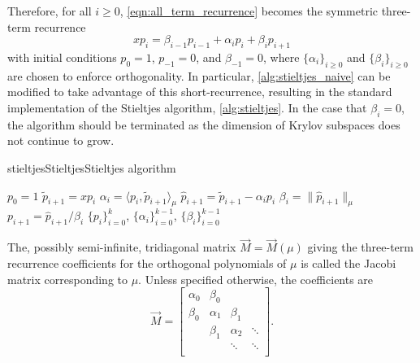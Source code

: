 Therefore, for all \( i\geq0 \), \cref{eqn:all_term_recurrence} becomes the symmetric three-term recurrence
\begin{equation}
    \label{eqn:poly_three_term}
    x p_i =  \beta_{i-1} p_{i-1} + \alpha_i p_i + \beta_{i} p_{i+1}
\end{equation}
with initial conditions \( p_0 = 1 \), \( p_{-1} = 0 \), and \( \beta_{-1} = 0 \), where \( \{ \alpha_i \}_{i\geq0} \) and \( \{ \beta_i \}_{i\geq 0} \) are chosen to enforce orthogonality.
In particular, \cref{alg:stieltjes_naive} can be modified to take advantage of this short-recurrence, resulting in the standard implementation of the Stieltjes algorithm, \cref{alg:stieltjes}.
In the case that \( \beta_i = 0 \), the algorithm should be terminated as the dimension of Krylov subspaces does not continue to grow.

\begin{labelalgorithm}[htb]{stieltjes}{Stieltjes}{Stieltjes algorithm}
\begin{algorithmic}[1]
    \State \( p_0 = 1 \)
        \State \( \tilde{p}_{i+1} = x p_i \)
        \State \( \alpha_i = \langle p_i, \tilde{p}_{i+1} \rangle_\mu \)
        \State \( \hat{p}_{i+1} = \tilde{p}_{i+1} - \alpha_i p_i \)
        \State \( \beta_{i} = \| \hat{p}_{i+1} \|_\mu\: \) 
        \State \( p_{i+1} = \hat{p}_{i+1} / \beta_i \)
    \EndFor
    \State \Return \( \{ p_i \}_{i=0}^{k} \), \( \{ \alpha_i \}_{i=0}^{k-1} \), \( \{\beta_i\}_{i=0}^{k-1} \) 
\EndProcedure
\end{algorithmic}
\end{labelalgorithm}

\begin{definition}
    \label{def:jacobi}
    The, possibly semi-infinite, tridiagonal matrix \( \vec{M} = \vec{M}(\mu) \) giving the three-term recurrence coefficients for the orthogonal polynomials of \( \mu \) is called the Jacobi matrix corresponding to \( \mu \). 
    Unless specified otherwise, the coefficients are 
    \begin{equation*}
    \vec{M} = 
    \begin{bmatrix}
        \alpha_0 & \beta_0 \\
        \beta_0 & \alpha_1 & \beta_1 & \phantom{\ddots}\\
        &\beta_1 & \alpha_2 & \ddots \\
        &&\ddots & \ddots \\
    \end{bmatrix}.
\end{equation*}
\end{definition}

